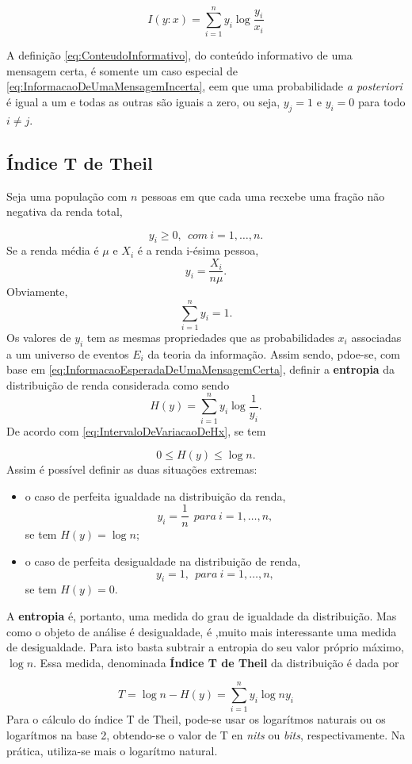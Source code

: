 \documentclass[
]{book}
\begin{document}
\[
I(y:x) = \sum_{i=1}^{n} y_i \log\dfrac{y_i}{x_i}
\label{eq:InformacaoDeUmaMensagemIncerta}
\]

A definição \eqref{eq:ConteudoInformativo}, do conteúdo informativo de uma mensagem certa, é somente um caso especial de \eqref{eq:InformacaoDeUmaMensagemIncerta}, eem que uma probabilidade \emph{a posteriori} é igual a um e todas as outras são iguais a zero, ou seja, \(y_j = 1\) e \(y_i = 0\) para todo \(i\neq j\).

\hypertarget{uxedndice-t-de-theil}{%
\subsection{Índice T de Theil}\label{uxedndice-t-de-theil}}

Seja uma população com \(n\) pessoas em que cada uma recxebe uma fração não negativa da renda total,

\[
  y_i \geq 0,~~com~i=1,\ldots ,n.
\]
Se a renda média é \(\mu\) e \(X_i\) é a renda i-ésima pessoa,
\[
  y_i = \dfrac{X_i}{n\mu}.
\]
Obviamente,
\[
  \sum_{i=1}^{n} y_i = 1.
\]
Os valores de \(y_i\) tem as mesmas propriedades que as probabilidades \(x_i\) associadas a um universo de eventos \(E_i\) da teoria da informação. Assim sendo, pdoe-se, com base em \eqref{eq:InformacaoEsperadaDeUmaMensagemCerta}, definir a \textbf{entropia} da distribuição de renda considerada como sendo
\[
  H(y) = \sum_{i=1}^{n} y_i \log \dfrac{1}{y_i}.
\]
De acordo com \eqref{eq:IntervaloDeVariacaoDeHx}, se tem

\[
  0\leq H(y) \leq \log n.
\]
Assim é possível definir as duas situações extremas:

\begin{itemize}
\item
  o caso de perfeita igualdade na distribuição da renda,
  \[
    y_i = \dfrac{1}{n}~~para~i=1, \ldots, n,
  \]
  se tem \(H(y) = \log n\);
\item
  o caso de perfeita desigualdade na distribuição de renda,
  \[
    y_i = 1,~~para~i=1, \ldots, n,
  \]
  se tem \(H(y) = 0\).
\end{itemize}

A \textbf{entropia} é, portanto, uma medida do grau de igualdade da distribuição. Mas como o objeto de análise é desigualdade, é ,muito mais interessante uma medida de desigualdade. Para isto basta subtrair a entropia do seu valor próprio máximo, \(\log n\). Essa medida, denominada \textbf{Índice T de Theil} da distribuição é dada por

\[
T = \log n - H(y) = \sum_{i=1}^{n}y_i \log n y_i
\label{eq:IndiceTDeTheil}
\]
Para o cálculo do índice T de Theil, pode-se usar os logarítmos naturais ou os logarítmos na base 2, obtendo-se o valor de T en \emph{nits} ou \emph{bits}, respectivamente. Na prática, utiliza-se mais o logarítmo natural.
\end{document}
